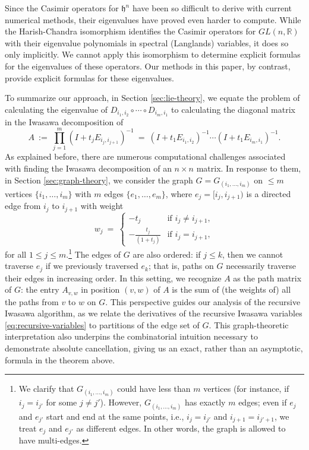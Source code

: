 \documentclass[12pt, reqno, oneside]{amsart}
\numberwithin{equation}{section}
\begin{document}
Since the Casimir operators for $\mathfrak{h}^n$ have been so difficult to derive with current numerical methods, their eigenvalues have proved even harder to compute. While the Harish-Chandra isomorphism \cite{Har51} identifies the Casimir operators for $GL(n,\mathbb{R})$ with their eigenvalue polynomials in spectral (Langlands) variables, it does so only implicitly. We cannot apply this isomorphism to determine explicit formulas for the eigenvalues of these operators. Our methods in this paper, by contrast, provide explicit formulas for these eigenvalues. 

To summarize our approach, in Section \ref{sec:lie-theory}, we equate the problem of calculating the eigenvalue of $D_{i_1,i_2} \circ \cdots \circ D_{i_m,i_1}$ to calculating the diagonal matrix in the Iwasawa decomposition of \begin{equation}\label{eq:elementary-matrix}
A \ := \ \prod_{j=1}^m(I+t_jE_{i_j,i_{j+1}})^{-1} \ = \ (I+t_1E_{i_1,i_2})^{-1} \cdots (I+t_1E_{i_m,i_1})^{-1}.
\end{equation}
As explained before, there are numerous computational challenges associated with finding the Iwasawa decomposition of an $n \times n$ matrix. In response to them, in Section \ref{sec:graph-theory}, we consider the graph $G = G_{(i_1,\dots,i_m)}$ on $\leq m$ vertices $\{i_1, \dots, i_m\}$ with $m$ edges $\{e_1, \dots, e_m\}$, where $e_j=[i_j,i_{j+1})$ is a directed edge from $i_j$ to $i_{j+1}$ with weight
\begin{equation}
w_j \ = \ 
\begin{cases}
-t_j & \text{if } i_j \neq i_{j+1}, \\
-\frac{t_j}{(1+t_j)} & \text{if } i_j = i_{j+1},
\end{cases}
\end{equation}
for all $1 \leq j \leq m$.\footnote{We clarify that $G_{(i_1,\dots,i_m)}$ could have less than $m$ vertices (for instance, if $i_j = i_{j'}$ for some $j \neq j'$). However, $G_{(i_1,\dots,i_m)}$ has exactly $m$ edges; even if $e_j$ and $e_{j'}$ start and end at the same points, i.e., $i_j = i_{j'}$ and $i_{j+1} = i_{j'+1}$, we treat $e_j$ and $e_{j'}$ as different edges. In other words, the graph is allowed to have multi-edges.} The edges of $G$ are also ordered: if $j\leq k$, then we cannot traverse $e_j$ if we previously traversed $e_k$; that is, paths on $G$ necessarily traverse their edges in increasing order. In this setting, we recognize $A$ as the path matrix of $G$: the entry $A_{v,w}$ in position $(v,w)$ of $A$ is the sum of (the weights of) all the paths from $v$ to $w$ on $G$. This perspective guides our analysis of the recursive Iwasawa algorithm, as we relate the derivatives of the recursive Iwasawa variables \eqref{eq:recursive-variables} to partitions of the edge set of $G$. This graph-theoretic interpretation also underpins the combinatorial intuition necessary to demonstrate absolute cancellation, giving us an exact, rather than an asymptotic, formula in the theorem above. 
\end{document}
